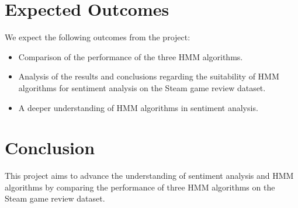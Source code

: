 \documentclass{article}
\begin{document}
\section{Expected Outcomes}
We expect the following outcomes from the project:
\begin{itemize}
\item Comparison of the performance of the three HMM algorithms.
\item Analysis of the results and conclusions regarding the suitability of HMM algorithms for sentiment analysis on the Steam game review dataset.
\item A deeper understanding of HMM algorithms in sentiment analysis.
\end{itemize}

\section{Conclusion}
This project aims to advance the understanding of sentiment analysis and HMM algorithms by comparing the performance of three HMM algorithms on the Steam game review dataset.
\end{document}
